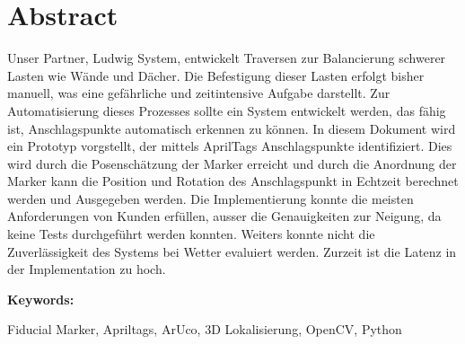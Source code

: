 \section*{Abstract}
Unser Partner, Ludwig System, entwickelt Traversen zur Balancierung schwerer Lasten wie Wände und Dächer. 
Die Befestigung dieser Lasten erfolgt bisher manuell, was eine gefährliche und zeitintensive Aufgabe darstellt. 
Zur Automatisierung dieses Prozesses sollte ein System entwickelt werden, das fähig ist, Anschlagspunkte automatisch erkennen zu können. 
In diesem Dokument wird ein Prototyp vorgstellt, der mittels AprilTags Anschlagspunkte identifiziert.
Dies wird durch die Posenschätzung der Marker erreicht und durch die Anordnung der Marker kann die Position und Rotation des Anschlagspunkt in Echtzeit berechnet werden und Ausgegeben werden.
Die Implementierung konnte die meisten Anforderungen von Kunden erfüllen, ausser die Genauigkeiten zur Neigung, da keine Tests durchgeführt werden konnten.
Weiters konnte nicht die Zuverlässigkeit des Systems bei Wetter evaluiert werden. 
Zurzeit ist die Latenz in der Implementation zu hoch. 
\vspace{2ex}

\textbf{Keywords:}

Fiducial Marker, Apriltags, ArUco, 3D Lokalisierung, OpenCV, Python

\clearpage


